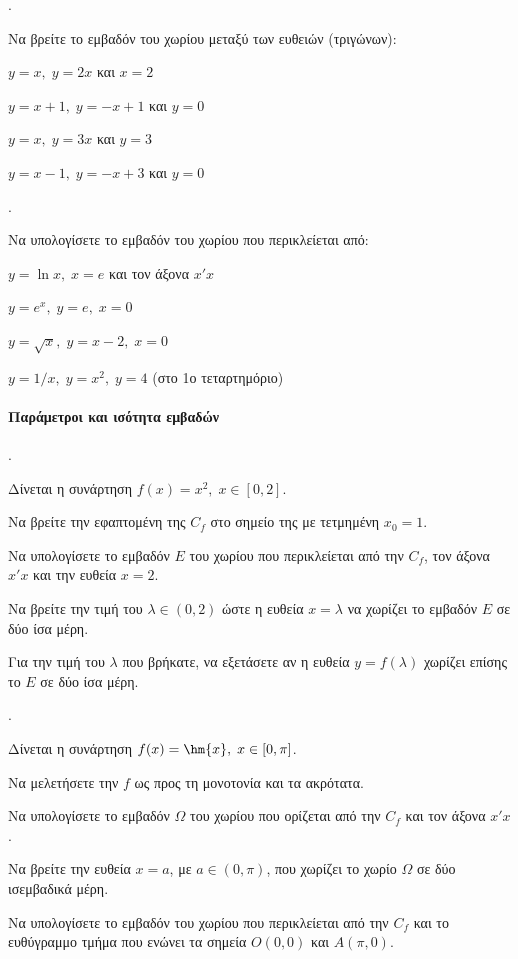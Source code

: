\documentclass[11pt,a4paper,twocolumn]{article}
\newcounter{askhsh}
\newcommand{\askhsh}{\large\theaskhsh.\ \addtocounter{askhsh}{1}}
\begin{document}
\askhsh Να βρείτε το εμβαδόν του χωρίου μεταξύ των ευθειών (τριγώνων):
\begin{alist}
\item $y=x, \; y=2x$ και $x=2$
\item $y=x+1, \; y=-x+1$ και $y=0$
\item $y=x, \; y=3x$ και $y=3$
\item $y=x-1, \; y=-x+3$ και $y=0$
\end{alist}

\askhsh Να υπολογίσετε το εμβαδόν του χωρίου που περικλείεται από:
\begin{alist}
\item $y=\ln{x}, \; x=e$ και τον άξονα $x'x$
\item $y=e^x, \; y=e, \; x=0$
\item $y=\sqrt{x}, \; y=x-2, \; x=0$
\item $y=1/x, \; y=x^2, \; y=4$ (στο 1ο τεταρτημόριο)
\end{alist}

\paragraph{Παράμετροι και ισότητα εμβαδών}
\askhsh Δίνεται η συνάρτηση $f(x)=x^2, \; x \in [0, 2]$.
\begin{alist}
\item Να βρείτε την εφαπτομένη της $C_f$ στο σημείο της με τετμημένη $x_0=1$.
\item Να υπολογίσετε το εμβαδόν $E$ του χωρίου που περικλείεται από την $C_f$, τον άξονα $x'x$ και την ευθεία $x=2$.
\item Να βρείτε την τιμή του $\lambda \in (0, 2)$ ώστε η ευθεία $x=\lambda$ να χωρίζει το εμβαδόν $E$ σε δύο ίσα μέρη.
\item Για την τιμή του $\lambda$ που βρήκατε, να εξετάσετε αν η ευθεία $y=f(\lambda)$ χωρίζει επίσης το $E$ σε δύο ίσα μέρη.
\end{alist}

\askhsh Δίνεται η συνάρτηση $f(x)=\hm{x}, \; x \in [0, \pi]$.
\begin{alist}
\item Να μελετήσετε την $f$ ως προς τη μονοτονία και τα ακρότατα.
\item Να υπολογίσετε το εμβαδόν $\Omega$ του χωρίου που ορίζεται από την $C_f$ και τον άξονα $x'x$.
\item Να βρείτε την ευθεία $x=a$, με $a \in (0, \pi)$, που χωρίζει το χωρίο $\Omega$ σε δύο ισεμβαδικά μέρη.
\item Να υπολογίσετε το εμβαδόν του χωρίου που περικλείεται από την $C_f$ και το ευθύγραμμο τμήμα που ενώνει τα σημεία $O(0,0)$ και $A(\pi, 0)$.
\end{alist}
\end{document}
